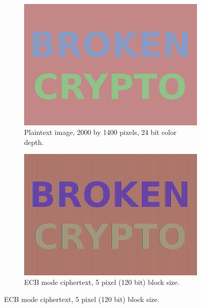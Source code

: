 \documentclass[11pt,ebook,table,dvipsnames]{memoir}
\begin{document}
\begin{figure}[p]
  \centering

  \begin{subfigure}[b]{.45\textwidth}
    \includegraphics[width=\textwidth]{./Illustrations/ECB/Plaintext.png}
    \caption{Plaintext image, 2000 by 1400 pixels, 24 bit color depth.}
    \label{fig:ECBDemoPlaintext}
  \end{subfigure}
  \quad
  \begin{subfigure}[b]{.45\textwidth}
    \includegraphics[width=\textwidth]{./Illustrations/ECB/Ciphertext5.png}
    \caption{ECB mode ciphertext, 5 pixel (120 bit) block size.}
    \label{fig:ECBDemo5px}
  \end{subfigure}


\end{figure}
\end{document}
